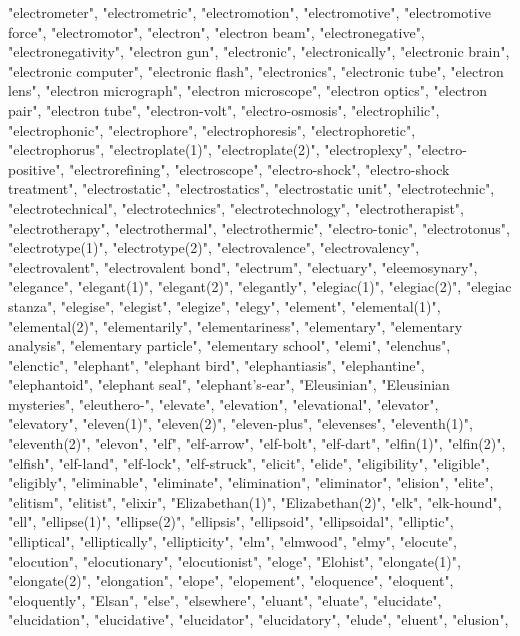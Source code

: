 "electrometer",
"electrometric",
"electromotion",
"electromotive",
"electromotive force",
"electromotor",
"electron",
"electron beam",
"electronegative",
"electronegativity",
"electron gun",
"electronic",
"electronically",
"electronic brain",
"electronic computer",
"electronic flash",
"electronics",
"electronic tube",
"electron lens",
"electron micrograph",
"electron microscope",
"electron optics",
"electron pair",
"electron tube",
"electron-volt",
"electro-osmosis",
"electrophilic",
"electrophonic",
"electrophore",
"electrophoresis",
"electrophoretic",
"electrophorus",
"electroplate(1)",
"electroplate(2)",
"electroplexy",
"electro-positive",
"electrorefining",
"electroscope",
"electro-shock",
"electro-shock treatment",
"electrostatic",
"electrostatics",
"electrostatic unit",
"electrotechnic",
"electrotechnical",
"electrotechnics",
"electrotechnology",
"electrotherapist",
"electrotherapy",
"electrothermal",
"electrothermic",
"electro-tonic",
"electrotonus",
"electrotype(1)",
"electrotype(2)",
"electrovalence",
"electrovalency",
"electrovalent",
"electrovalent bond",
"electrum",
"electuary",
"eleemosynary",
"elegance",
"elegant(1)",
"elegant(2)",
"elegantly",
"elegiac(1)",
"elegiac(2)",
"elegiac stanza",
"elegise",
"elegist",
"elegize",
"elegy",
"element",
"elemental(1)",
"elemental(2)",
"elementarily",
"elementariness",
"elementary",
"elementary analysis",
"elementary particle",
"elementary school",
"elemi",
"elenchus",
"elenctic",
"elephant",
"elephant bird",
"elephantiasis",
"elephantine",
"elephantoid",
"elephant seal",
"elephant's-ear",
"Eleusinian",
"Eleusinian mysteries",
"eleuthero-",
"elevate",
"elevation",
"elevational",
"elevator",
"elevatory",
"eleven(1)",
"eleven(2)",
"eleven-plus",
"elevenses",
"eleventh(1)",
"eleventh(2)",
"elevon",
"elf",
"elf-arrow",
"elf-bolt",
"elf-dart",
"elfin(1)",
"elfin(2)",
"elfish",
"elf-land",
"elf-lock",
"elf-struck",
"elicit",
"elide",
"eligibility",
"eligible",
"eligibly",
"eliminable",
"eliminate",
"elimination",
"eliminator",
"elision",
"elite",
"elitism",
"elitist",
"elixir",
"Elizabethan(1)",
"Elizabethan(2)",
"elk",
"elk-hound",
"ell",
"ellipse(1)",
"ellipse(2)",
"ellipsis",
"ellipsoid",
"ellipsoidal",
"elliptic",
"elliptical",
"elliptically",
"ellipticity",
"elm",
"elmwood",
"elmy",
"elocute",
"elocution",
"elocutionary",
"elocutionist",
"eloge",
"Elohist",
"elongate(1)",
"elongate(2)",
"elongation",
"elope",
"elopement",
"eloquence",
"eloquent",
"eloquently",
"Elsan",
"else",
"elsewhere",
"eluant",
"eluate",
"elucidate",
"elucidation",
"elucidative",
"elucidator",
"elucidatory",
"elude",
"eluent",
"elusion",
